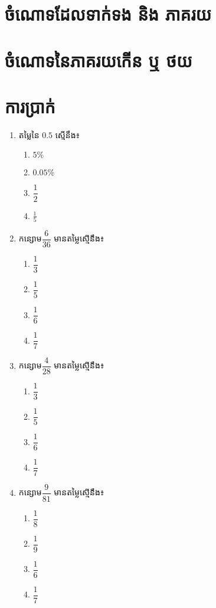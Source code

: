 \section{ចំណោទដែលទាក់ទង និង ភាគរយ}
\section{ចំណោទនៃភាគរយកើន ឬ ថយ}
\section{ការប្រាក់}


\newpage
\pros
\begin{enumerate}
\item តម្លៃនៃ $0.5$ ស្មើនឹង៖
\begin{multicols}{4}
\begin{enumerate}[label=\alph*.]
\item $5\%$
\item $0.05\%$
\item $\dfrac{1}{2}$
\item $\frac{1}{5}$
\end{enumerate}
\end{multicols}

\item កន្សោម$\dfrac{6}{36}$ មានតម្លៃស្មើនឹង៖
\begin{multicols}{4}
\begin{enumerate}[label=\alph*.]
\item $\dfrac{1}{3}$
\item $\dfrac{1}{5}$
\item $\dfrac{1}{6}$
\item $\dfrac{1}{7}$
\end{enumerate}
\end{multicols}

\item កន្សោម$\dfrac{4}{28}$ មានតម្លៃស្មើនឹង៖
\begin{multicols}{4}
\begin{enumerate}[label=\alph*.]
\item $\dfrac{1}{3}$
\item $\dfrac{1}{5}$
\item $\dfrac{1}{6}$
\item $\dfrac{1}{7}$
\end{enumerate}
\end{multicols}

\item កន្សោម$\dfrac{9}{81}$ មានតម្លៃស្មើនឹង៖
\begin{multicols}{4}
\begin{enumerate}[label=\alph*.]
\item $\dfrac{1}{8}$
\item $\dfrac{1}{9}$
\item $\dfrac{1}{6}$
\item $\dfrac{1}{7}$
\end{enumerate}
\end{multicols}


\end{enumerate}
